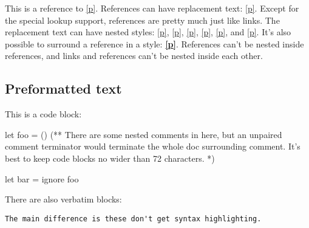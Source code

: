 This is a reference to \hyperref[page-test+u+package+++ml-module-Markup-val-foo]{[p\pageref*{page-test+u+package+++ml-module-Markup-val-foo}]}. References can have replacement text: \hyperref[page-test+u+package+++ml-module-Markup-val-foo]{[p\pageref*{page-test+u+package+++ml-module-Markup-val-foo}]}. Except for the special lookup support, references are pretty much just like links. The replacement text can have nested styles: \hyperref[page-test+u+package+++ml-module-Markup-val-foo]{[p\pageref*{page-test+u+package+++ml-module-Markup-val-foo}]}, \hyperref[page-test+u+package+++ml-module-Markup-val-foo]{[p\pageref*{page-test+u+package+++ml-module-Markup-val-foo}]}, \hyperref[page-test+u+package+++ml-module-Markup-val-foo]{[p\pageref*{page-test+u+package+++ml-module-Markup-val-foo}]}, \hyperref[page-test+u+package+++ml-module-Markup-val-foo]{[p\pageref*{page-test+u+package+++ml-module-Markup-val-foo}]}, \hyperref[page-test+u+package+++ml-module-Markup-val-foo]{[p\pageref*{page-test+u+package+++ml-module-Markup-val-foo}]}, and \hyperref[page-test+u+package+++ml-module-Markup-val-foo]{[p\pageref*{page-test+u+package+++ml-module-Markup-val-foo}]}. It's also possible to surround a reference in a style: \textbf{\hyperref[page-test+u+package+++ml-module-Markup-val-foo]{[p\pageref*{page-test+u+package+++ml-module-Markup-val-foo}]}}. References can't be nested inside references, and links and references can't be nested inside each other.

\subsection{Preformatted text\label{preformatted-text}}%
This is a code block:\medbreak
\begin{ocamlcodeblock}
let foo = ()
(** There are some nested comments in here, but an unpaired comment
    terminator would terminate the whole doc surrounding comment. It's
    best to keep code blocks no wider than 72 characters. *)

let bar =
  ignore foo
\end{ocamlcodeblock}\medbreak
There are also verbatim blocks:

\begin{verbatim}The main difference is these don't get syntax highlighting.\end{verbatim}%
